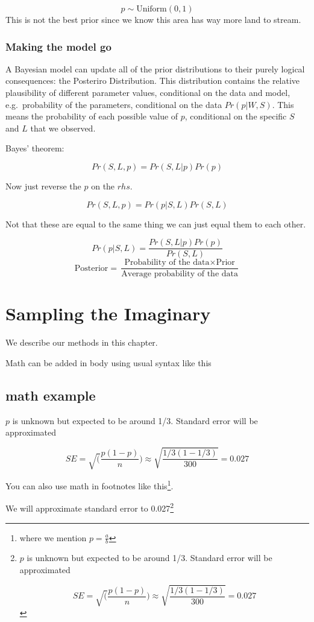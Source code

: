 \documentclass[
]{book}
\begin{document}
\[
p \sim \text{Uniform}(0,1)
\]
This is not the best prior since we know this area has way more land to stream.

\hypertarget{making-the-model-go}{%
\subsection{Making the model go}\label{making-the-model-go}}

A Bayesian model can update all of the prior distributions to their purely logical consequences: the Posteriro Distribution. This distribution contains the relative plausibility of different parameter values, conditional on the data and model, e.g.~probability of the parameters, conditional on the data \(Pr(p|W,S)\). This means the probability of each possible value of \(p\), conditional on the specific \(S\) and \(L\) that we observed.

Bayes' theorem:

\[
Pr(S, L, p) = Pr(S, L|p)Pr(p)
\]

Now just reverse the \(p\) on the \(rhs\).

\[
Pr(S, L, p) = Pr(p|S, L)Pr(S,L)
\]

Not that these are equal to the same thing we can just equal them to each other.

\[
Pr(p|S,L)=\frac{Pr(S, L|p)Pr(p)}{Pr(S,L)}
\]
\[
\text{Posterior}=\frac{\text{Probability of the data} \times \text{Prior}}{\text{Average probability of the data}}
\]

\hypertarget{sampling-the-imaginary}{%
\chapter{Sampling the Imaginary}\label{sampling-the-imaginary}}

We describe our methods in this chapter.

Math can be added in body using usual syntax like this

\hypertarget{math-example}{%
\section{math example}\label{math-example}}

\(p\) is unknown but expected to be around 1/3. Standard error will be approximated

\[
SE = \sqrt(\frac{p(1-p)}{n}) \approx \sqrt{\frac{1/3 (1 - 1/3)} {300}} = 0.027
\]

You can also use math in footnotes like this\footnote{where we mention \(p = \frac{a}{b}\)}.

We will approximate standard error to 0.027\footnote{\(p\) is unknown but expected to be around 1/3. Standard error will be approximated

  \[
  SE = \sqrt(\frac{p(1-p)}{n}) \approx \sqrt{\frac{1/3 (1 - 1/3)} {300}} = 0.027
  \]}

  
\end{document}
